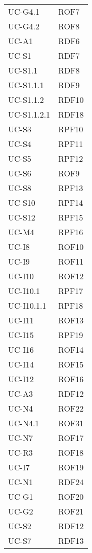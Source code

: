 \begin{longtable}{| p{5cm} | p{5cm} |}
		\rowcolor{LightGray}
		UC-G4.1 & ROF7 \\
		UC-G4.2 & ROF8 \\
		\rowcolor{LightGray}
		UC-A1 & RDF6\\
		UC-S1 & RDF7 \\
		\rowcolor{LightGray}
		UC-S1.1 & RDF8\\
		UC-S1.1.1 & RDF9\\
		\rowcolor{LightGray}
		UC-S1.1.2 & RDF10\\
		UC-S1.1.2.1 & RDF18\\
		\rowcolor{LightGray}
		UC-S3 & RPF10\\
		UC-S4 & RPF11\\
		\rowcolor{LightGray}
		UC-S5 & RPF12 \\
		UC-S6 & ROF9 \\
		\rowcolor{LightGray}
		UC-S8 & RPF13 \\
		UC-S10 & RPF14 \\
		\rowcolor{LightGray}
		UC-S12 & RPF15 \\ 
		UC-M4 & RPF16\\
		\rowcolor{LightGray}
		UC-I8 & ROF10 \\
		UC-I9 & ROF11 \\
		\rowcolor{LightGray}
		UC-I10 & ROF12 \\
		UC-I10.1 & RPF17 \\
		\rowcolor{LightGray}
		UC-I10.1.1 & RPF18\\
		UC-I11 & ROF13 \\
		\rowcolor{LightGray}
		UC-I15 & RPF19 \\
		UC-I16 & ROF14 \\
		\rowcolor{LightGray}
		UC-I14 & ROF15 \\
		UC-I12 & ROF16 \\
		\rowcolor{LightGray}
		UC-A3 & RDF12\\
		UC-N4 & ROF22\\
		\rowcolor{LightGray}
		UC-N4.1 & ROF31\\
		UC-N7 & ROF17\\
		\rowcolor{LightGray}
		UC-R3 & ROF18\\
		\rowcolor{LightGray}
		UC-I7 & ROF19\\
		UC-N1 & RDF24\\
		\rowcolor{LightGray}
		UC-G1 & ROF20\\
		UC-G2 & ROF21\\
		\rowcolor{LightGray}
		UC-S2 & RDF12\\
		UC-S7 & RDF13\\

\end{longtable}
